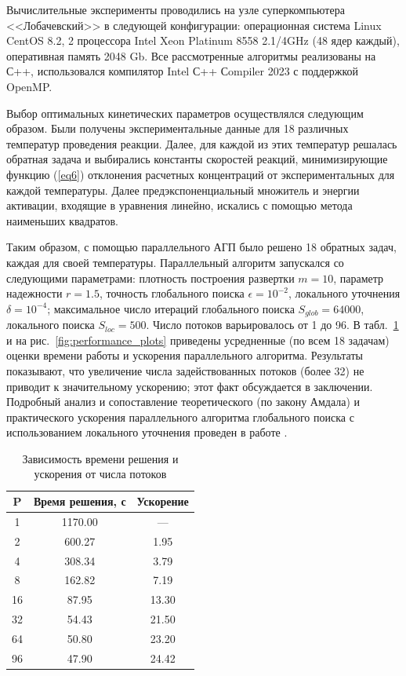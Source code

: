 \documentclass{cmi1}
\begin{document}
Вычислительные эксперименты проводились на узле суперкомпьютера <<Лобачевский>> в следующей конфигурации: операционная система Linux CentOS 8.2, 2 процессора Intel Xeon Platinum 8558 2.1/4GHz (48 ядер каждый), оперативная память 2048 Gb. 
Все рассмотренные алгоритмы реализованы на С++, использовался компилятор Intel С++ Сompiler 2023 с поддержкой OpenMP.

Выбор оптимальных кинетических параметров осуществлялся следующим образом. Были получены экспериментальные данные для 18 различных температур проведения реакции. Далее, для каждой из этих температур решалась обратная задача и выбирались константы скоростей реакций, минимизирующие функцию (\ref{eq6}) отклонения расчетных концентраций от экспериментальных для каждой температуры. Далее предэкспоненциальный множитель и энергии активации, входящие в уравнения линейно, искались с помощью метода наименьших квадратов.

Таким образом, с помощью параллельного АГП было решено 18 обратных задач, каждая для своей температуры.
Параллельный алгоритм запускался со следующими параметрами: плотность построения развертки $m=10$, параметр надежности $r=1.5$, точность глобального поиска $\epsilon = 10^{-2}$, локального уточнения $\delta = 10^{-4}$; максимальное число итераций глобального поиска $S_{glob} = 64 000$, локального поиска $S_{loc} = 500$. Число потоков варьировалось от 1 до 96.
В табл.~\ref{tab:scalability} и на рис.~\ref{fig:performance_plots} приведены усредненные (по всем 18 задачам) оценки времени работы и ускорения параллельного алгоритма. Результаты показывают, что увеличение числа задействованных потоков (более 32) не приводит к значительному ускорению; этот факт обсуждается в заключении.
Подробный анализ и сопоставление теоретического (по закону Амдала) и практического ускорения параллельного алгоритма глобального поиска с использованием локального уточнения проведен в работе .

\begin{table}[h]
\noindent
\caption{Зависимость времени решения и ускорения от числа потоков}
\label{tab:scalability}
\centering
\begin{tabular}{|c|c|c|}
\hline
\textbf{P} & \textbf{Время решения, с} & \textbf{Ускорение} \\
\hline
1   & 1170.00  & --- \\
2   & 600.27  & 1.95 \\
4   & 308.34  & 3.79 \\
8   & 162.82  & 7.19 \\
16  & 87.95   & 13.30 \\
32  & 54.43   & 21.50 \\
64  & 50.80   & 23.20 \\
96  & 47.90   & 24.42 \\
\hline
\end{tabular}
\end{table}
\end{document}
